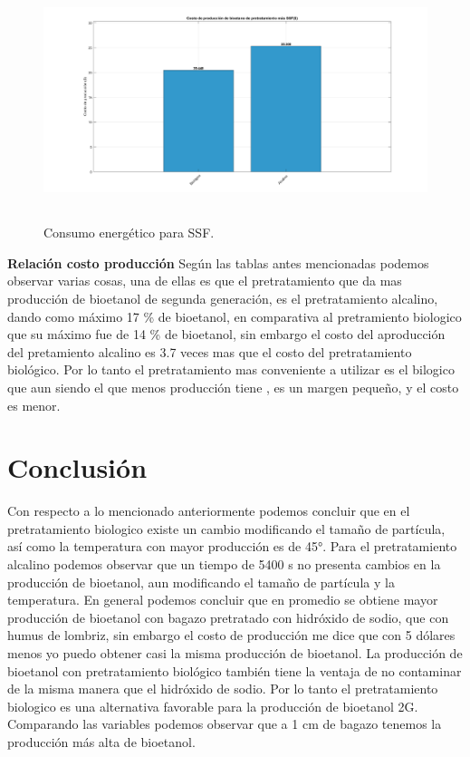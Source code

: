 \documentclass[12pt]{article}
\begin{document}
\begin{figure} [H]
	\centering
	\includegraphics[width=16cm, height=7cm]{imagenes/costos}
	\caption{Consumo energético para SSF. }
	\label{grafica}
\end{figure}
\textbf{Relación costo producción}
\newline
Según las tablas antes mencionadas podemos observar varias cosas, una de ellas es que el pretratamiento que da mas producción de bioetanol de segunda generación, es el  pretratamiento alcalino, dando como máximo 17 \% de bioetanol, en comparativa al pretramiento biologico que su máximo fue de 14 \% de bioetanol, sin embargo el costo del aproducción del pretamiento alcalino es 3.7 veces mas que el costo del pretratamiento biológico.
Por lo tanto el pretratamiento mas conveniente a utilizar es el bilogico que aun siendo el que menos producción tiene , es un margen pequeño, y el costo es menor.






		\section{Conclusión}
		Con respecto a lo mencionado anteriormente podemos concluir que en el pretratamiento biologico existe un cambio modificando el tamaño de partícula, así como la temperatura con mayor producción es de 45°.
		Para el pretratamiento alcalino podemos observar que un tiempo de  5400 s no presenta cambios en la producción de bioetanol, aun modificando el tamaño de partícula y la temperatura. En general podemos concluir que en promedio se obtiene mayor producción de bioetanol con bagazo pretratado con hidróxido de sodio, que con humus de lombriz, sin embargo el costo de producción me dice que con 5 dólares menos yo puedo obtener casi la misma producción de bioetanol. La producción de bioetanol con pretratamiento biológico también tiene la ventaja de no contaminar de la misma manera que el hidróxido de sodio.
		Por lo tanto el pretratamiento biologico es una alternativa favorable para la producción de bioetanol 2G. Comparando las variables podemos observar que a 1 cm de bagazo tenemos la producción más alta de bioetanol.
		
\end{document}
